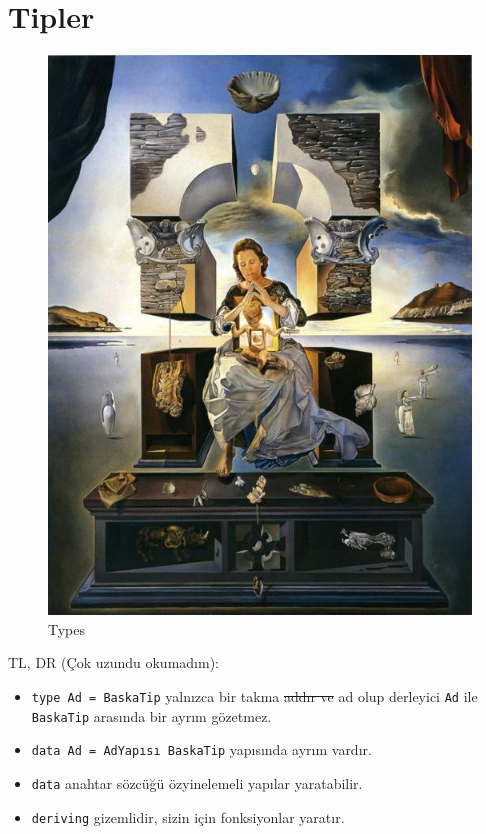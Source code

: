 \documentclass[a4paper,14pt,openany]{extbook} %
\begin{document}
\pagebreak
\section{Tipler}\label{tipler}
\begin{figure}[htbp]
  \centering
  \includegraphics{img/salvador-dali-the-madonna-of-port-lligat.jpg}
  \caption{Types}
\end{figure}

TL, DR (Çok uzundu okumadım):
\begin{itemize}
  \item \lstinline!type Ad = BaskaTip! yalnızca bir takma \st{addır ve} ad olup derleyici \lstinline!Ad! ile \lstinline!BaskaTip!
    arasında bir ayrım gözetmez.
  \item \lstinline!data Ad = AdYapısı BaskaTip! yapısında ayrım vardır.
  \item \lstinline!data! anahtar sözcüğü özyinelemeli yapılar yaratabilir.
  \item \lstinline!deriving! gizemlidir, sizin için fonksiyonlar yaratır.
\end{itemize}
\end{document}
